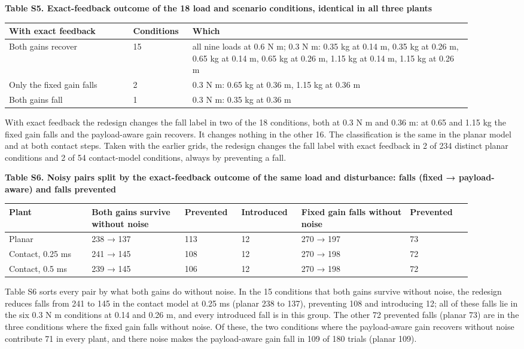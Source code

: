 \documentclass[11pt,a4paper]{article}
\begin{document}
\textbf{Table S5. Exact-feedback outcome of the 18 load and scenario conditions, identical in all three plants}
\begin{longtable}{p{0.243\linewidth}p{0.108\linewidth}p{0.549\linewidth}}
\toprule
With exact feedback & Conditions & Which \\ \midrule \endhead
Both gains recover & 15 & all nine loads at 0.6 N m; 0.3 N m: 0.35 kg at 0.14 m, 0.35 kg at 0.26 m, 0.65 kg at 0.14 m, 0.65 kg at 0.26 m, 1.15 kg at 0.14 m, 1.15 kg at 0.26 m \\
Only the fixed gain falls & 2 & 0.3 N m: 0.65 kg at 0.36 m, 1.15 kg at 0.36 m \\
Both gains fall & 1 & 0.3 N m: 0.35 kg at 0.36 m \\
\bottomrule
\end{longtable}
With exact feedback the redesign changes the fall label in two of the 18 conditions, both at 0.3 N m and 0.36 m: at 0.65 and 1.15 kg the fixed gain falls and the payload-aware gain recovers. It changes nothing in the other 16. The classification is the same in the planar model and at both contact steps. Taken with the earlier grids, the redesign changes the fall label with exact feedback in 2 of 234 distinct planar conditions and 2 of 54 contact-model conditions, always by preventing a fall.

\textbf{Table S6. Noisy pairs split by the exact-feedback outcome of the same load and disturbance: falls (fixed → payload-aware) and falls prevented}
\begin{longtable}{p{0.162\linewidth}p{0.18\linewidth}p{0.108\linewidth}p{0.108\linewidth}p{0.216\linewidth}p{0.126\linewidth}}
\toprule
Plant & Both gains survive without noise & Prevented & Introduced & Fixed gain falls without noise & Prevented \\ \midrule \endhead
Planar & 238 → 137 & 113 & 12 & 270 → 197 & 73 \\
Contact, 0.25 ms & 241 → 145 & 108 & 12 & 270 → 198 & 72 \\
Contact, 0.5 ms & 239 → 145 & 106 & 12 & 270 → 198 & 72 \\
\bottomrule
\end{longtable}
Table S6 sorts every pair by what both gains do without noise. In the 15 conditions that both gains survive without noise, the redesign reduces falls from 241 to 145 in the contact model at 0.25 ms (planar 238 to 137), preventing 108 and introducing 12; all of these falls lie in the six 0.3 N m conditions at 0.14 and 0.26 m, and every introduced fall is in this group. The other 72 prevented falls (planar 73) are in the three conditions where the fixed gain falls without noise. Of these, the two conditions where the payload-aware gain recovers without noise contribute 71 in every plant, and there noise makes the payload-aware gain fall in 109 of 180 trials (planar 109).
\end{document}
